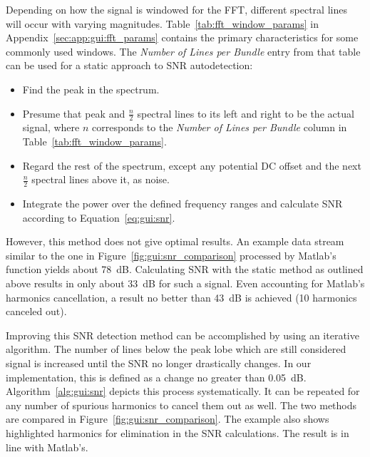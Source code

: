 Depending  on how  the  signal is  windowed for  the  FFT, different  spectral
lines will occur with varying magnitudes. Table~\ref{tab:fft_window_params} in
Appendix~\ref{sec:app:gui:fft_params} contains the primary characteristics for
some commonly used  windows. The \emph{Number of Lines per  Bundle} entry from
that table can be used for a static approach to SNR autodetection:
\begin{itemize}\tightlist
    \item
        Find the peak in the spectrum.
    \item
        Presume   that  peak   and   $\frac{n}{2}$  spectral   lines  to   its
        left   and    right   to   be    the   actual   signal,    where   $n$
        corresponds  to  the  \emph{Number  of Lines  per  Bundle}  column  in
        Table~\ref{tab:fft_window_params}.
    \item
        Regard the  rest of the spectrum,  except any potential DC  offset and
        the next $\frac{n}{2}$ spectral lines above it, as noise.
    \item
        Integrate the  power over the  defined frequency ranges  and calculate
        SNR according to Equation~\ref{eq:gui:snr}.
\end{itemize}
However, this  method does  not give optimal  results. An example  data stream
similar  to  the  one   in  Figure~\ref{fig:gui:snr_comparison}  processed  by
Matlab's  function yields about \SI{78}{\dB}. Calculating SNR with
the static  method as outlined  above results  in only about  \SI{33}{\dB} for
such a signal.  Even accounting  for Matlab's harmonics cancellation, a result
no better than \SI{43}{\dB} is achieved (\num{10} harmonics canceled out).

Improving  this  SNR  detection  method   can  be  accomplished  by  using  an
iterative  algorithm. The   number  of  lines   below  the  peak   lobe  which
are  still   considered  signal   is  increased  until   the  SNR   no  longer
drastically  changes. In  our implementation,  this  is  defined as  a  change
no  greater  than   \SI{0.05}{\dB}. Algorithm~\ref{alg:gui:snr}  depicts  this
process  systematically.   It can  be  repeated  for  any number  of  spurious
harmonics  to  cancel   them  out  as  well. The  two   methods  are  compared
in  Figure~\ref{fig:gui:snr_comparison}. The  example also  shows  highlighted
harmonics for elimination in the SNR calculations. The result is in line with
Matlab's.

